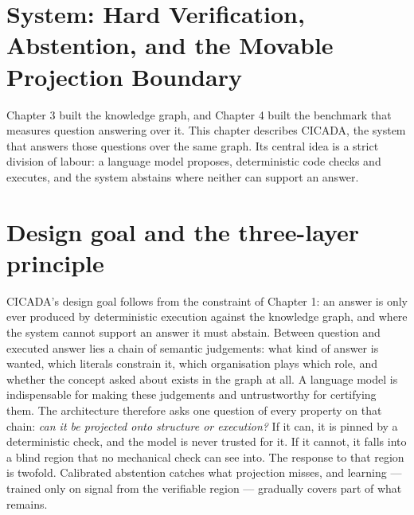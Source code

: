 \documentclass[10pt]{article} %
\begin{document}
\section{System: Hard Verification, Abstention, and the Movable Projection Boundary}\label{sec:chapter-5-system-hard-verification-abste}

Chapter 3 built the knowledge graph, and Chapter 4 built the benchmark that measures question answering over it. This chapter describes CICADA, the system that answers those questions over the same graph. Its central idea is a strict division of labour: a language model proposes, deterministic code checks and executes, and the system abstains where neither can support an answer.

\section{Design goal and the three-layer principle}\label{sec:design-goal-and-the-three-layer-principl}

CICADA's design goal follows from the constraint of Chapter 1: an answer is only ever produced by deterministic execution against the knowledge graph, and where the system cannot support an answer it must abstain. Between question and executed answer lies a chain of semantic judgements: what kind of answer is wanted, which literals constrain it, which organisation plays which role, and whether the concept asked about exists in the graph at all. A language model is indispensable for making these judgements and untrustworthy for certifying them. The architecture therefore asks one question of every property on that chain: \emph{can it be projected onto structure or execution?} If it can, it is pinned by a deterministic check, and the model is never trusted for it. If it cannot, it falls into a blind region that no mechanical check can see into. The response to that region is twofold. Calibrated abstention catches what projection misses, and learning --- trained only on signal from the verifiable region --- gradually covers part of what remains.
\end{document}
